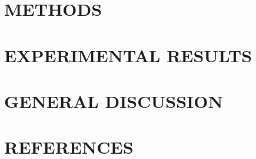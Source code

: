 \documentclass[%
	paper=A4,						%
	twoside=true,					%
	openright,						%
	parskip=full,					%
	chapterprefix=true,				%
	11pt,							%
	headings=normal,				%
	bibliography=totoc,				%
	listof=totoc,					%
	titlepage=on,					%
	captions=tableabove,			%
	draft=false,					%
]{scrreprt}%
\begin{document}
\part{METHODS}



\cleardoublepage
\part{EXPERIMENTAL RESULTS}






\cleardoublepage
\part{GENERAL DISCUSSION}

\cleardoublepage
\part{REFERENCES} \cleardoublepage
{
\renewcommand{\bibfont}{\normalfont\small}
\setlength{\biblabelsep}{0.2pt}
\setlength{\bibitemsep}{0.5\baselineskip plus 0.5\baselineskip}
\printbibliography[nottype=online, heading=none]
}

\cleardoublepage


\cleardoublepage
\end{document}
